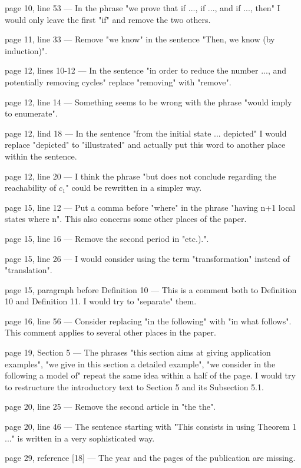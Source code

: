 \documentclass[11pt]{article}
\begin{document}
page 10, line 53 ---
In the phrase "we prove that if ..., if ..., and if ..., then" I would only leave the first "if" and remove the two others.

page 11, line 33 ---
Remove "we know" in the sentence "Then, we know (by induction)".

page 12, lines 10-12 ---
In the sentence "in order to reduce the number ..., and potentially removing cycles" replace "removing" with "remove".

page 12, line 14 ---
Something seems to be wrong with the phrase "would imply to enumerate".

page 12, lind 18 ---
In the sentence "from the initial state ... depicted" I would replace "depicted" to "illustrated" and actually put this word to another place within the sentence.

page 12, line 20 ---
I think the phrase "but does not conclude regarding the reachability of $c_1$" could be rewritten in a simpler way.

page 15, line 12 ---
Put a comma before "where" in the phrase "having n+1 local states where n".
This also concerns some other places of the paper.

page 15, line 16 ---
Remove the second period in "etc.).".

page 15, line 26 ---
I would consider using the term "transformation" instead of "translation".

page 15, paragraph before Definition 10 ---
This is a comment both to Definition 10 and Definition 11. I would try to "separate" them.

page 16, line 56 ---
Consider replacing "in the following" with "in what follows".
This comment applies to several other places in the paper.

page 19, Section 5 ---
The phrases "this section aims at giving application examples", "we give in this section a detailed example", "we consider in the following a model of" repeat the same idea within a half of the page. I would try to restructure the introductory text to Section 5 and its Subsection 5.1.

page 20, line 25 ---
Remove the second article in "the the".

page 20, line 46 ---
The sentence starting with "This consists in using Theorem 1 ..." is written in a very sophisticated way.

page 29, reference [18] ---
The year and the pages of the publication are missing.
\end{document}
